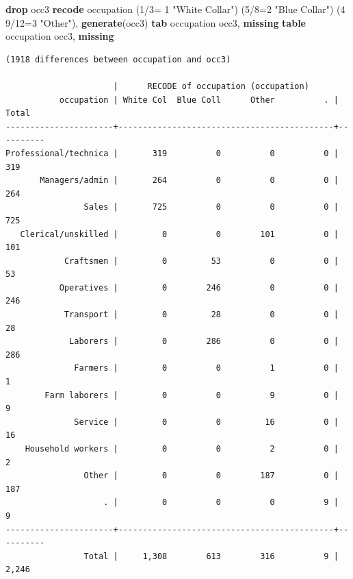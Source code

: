 \documentclass[
]{book}
\newenvironment{Shaded}{\begin{snugshade}}{\end{snugshade}}
\newcommand{\FunctionTok}[1]{\textcolor[rgb]{0.13,0.29,0.53}{\textbf{#1}}}
\newcommand{\KeywordTok}[1]{\textcolor[rgb]{0.13,0.29,0.53}{\textbf{#1}}}
\newcommand{\NormalTok}[1]{#1}
\newcommand{\StringTok}[1]{\textcolor[rgb]{0.31,0.60,0.02}{#1}}
\begin{document}
\begin{Shaded}
\begin{Highlighting}[]
\KeywordTok{drop}\NormalTok{ occ3}
\KeywordTok{recode}\NormalTok{ occupation (1/3= 1 }\StringTok{"White Collar"}\NormalTok{) (5/8=2 }\StringTok{"Blue Collar"}\NormalTok{) (4 9/12=3 }\StringTok{"Other"}\NormalTok{), }\KeywordTok{generate}\NormalTok{(occ3)}
\KeywordTok{tab}\NormalTok{ occupation occ3, }\FunctionTok{missing}
\KeywordTok{table}\NormalTok{ occupation occ3, }\FunctionTok{missing}
\end{Highlighting}
\end{Shaded}

\begin{verbatim}
(1918 differences between occupation and occ3)

                      |      RECODE of occupation (occupation)
           occupation | White Col  Blue Coll      Other          . |     Total
----------------------+--------------------------------------------+----------
Professional/technica |       319          0          0          0 |       319 
       Managers/admin |       264          0          0          0 |       264 
                Sales |       725          0          0          0 |       725 
   Clerical/unskilled |         0          0        101          0 |       101 
            Craftsmen |         0         53          0          0 |        53 
           Operatives |         0        246          0          0 |       246 
            Transport |         0         28          0          0 |        28 
             Laborers |         0        286          0          0 |       286 
              Farmers |         0          0          1          0 |         1 
        Farm laborers |         0          0          9          0 |         9 
              Service |         0          0         16          0 |        16 
    Household workers |         0          0          2          0 |         2 
                Other |         0          0        187          0 |       187 
                    . |         0          0          0          9 |         9 
----------------------+--------------------------------------------+----------
                Total |     1,308        613        316          9 |     2,246 




\end{verbatim}
\end{document}
